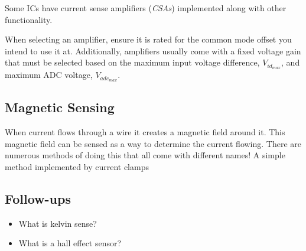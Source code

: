 \documentclass[main.tex]{subfiles}
\begin{document}
Some ICs have current sense amplifiers (\textit{CSAs}) implemented along with other functionality. 

When selecting an amplifier, ensure it is rated for the common mode offset you intend to use it at. Additionally, amplifiers usually come with a fixed voltage gain that must be selected based on the maximum input voltage difference, $V_{id_{max}}$, and maximum ADC voltage, $V_{adc_{max}}$. 

\subsection{Magnetic Sensing}
When current flows through a wire it creates a magnetic field around it. This magnetic field can be sensed as a way to determine the current flowing. There are numerous methods of doing this that all come with different names! A simple method implemented by current clamps 

\subsection{Follow-ups}
\begin{itemize}
    \item What is kelvin sense?
    \item What is a hall effect sensor?
\end{itemize}
\end{document}
